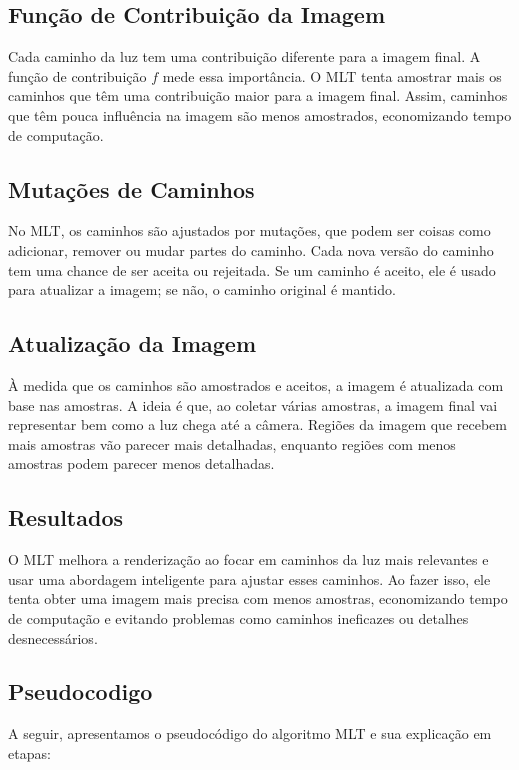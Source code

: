 \documentclass{article}
\begin{document}
\subsection{Função de Contribuição da Imagem}

Cada caminho da luz tem uma contribuição diferente para a imagem final. A função de contribuição \( f \) mede essa importância. O MLT tenta amostrar mais os caminhos que têm uma contribuição maior para a imagem final. Assim, caminhos que têm pouca influência na imagem são menos amostrados, economizando tempo de computação.

\subsection{Mutações de Caminhos}

No MLT, os caminhos são ajustados por mutações, que podem ser coisas como adicionar, remover ou mudar partes do caminho. Cada nova versão do caminho tem uma chance de ser aceita ou rejeitada. Se um caminho é aceito, ele é usado para atualizar a imagem; se não, o caminho original é mantido.

\subsection{Atualização da Imagem}

À medida que os caminhos são amostrados e aceitos, a imagem é atualizada com base nas amostras. A ideia é que, ao coletar várias amostras, a imagem final vai representar bem como a luz chega até a câmera. Regiões da imagem que recebem mais amostras vão parecer mais detalhadas, enquanto regiões com menos amostras podem parecer menos detalhadas.

\subsection{Resultados}

O MLT melhora a renderização ao focar em caminhos da luz mais relevantes e usar uma abordagem inteligente para ajustar esses caminhos. Ao fazer isso, ele tenta obter uma imagem mais precisa com menos amostras, economizando tempo de computação e evitando problemas como caminhos ineficazes ou detalhes desnecessários.

\subsection{Pseudocodigo}
A seguir, apresentamos o pseudocódigo do algoritmo MLT e sua explicação em etapas:
\end{document}
